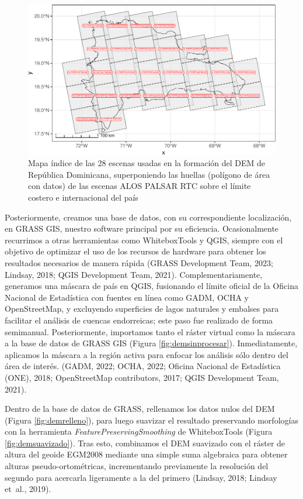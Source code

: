 \documentclass[spanish]{article}
\begin{document}
\begin{figure}

{\centering \includegraphics[width=0.8\linewidth]{preprint_files/figure-latex/mapaindice-1} 

}

\caption{Mapa índice de las 28 escenas usadas en la formación del DEM de República Dominicana, superponiendo las huellas (polígono de área con datos) de las escenas ALOS PALSAR RTC sobre el límite costero e internacional del país}\label{fig:mapaindice}
\end{figure}

Posteriormente, creamos una base de datos, con su correspondiente
localización, en GRASS GIS, nuestro software principal por su
eficiencia. Ocasionalmente recurrimos a otras herramientas como
WhiteboxTools y QGIS, siempre con el objetivo de optimizar el uso de los
recursos de hardware para obtener los resultados necesarios de manera
rápida (GRASS Development Team, 2023; Lindsay, 2018; QGIS Development
Team, 2021). Complementariamente, generamos una máscara de país en QGIS,
fusionando el límite oficial de la Oficina Nacional de Estadística con
fuentes en línea como GADM, OCHA y OpenStreetMap, y excluyendo
superficies de lagos naturales y embalses para facilitar el análisis de
cuencas endorreicas; este paso fue realizado de forma semimanual.
Posteriormente, importamos tanto el ráster virtual como la máscara a la
base de datos de GRASS GIS (Figura \ref{fig:demsinprocesar}).
Inmediatamente, aplicamos la máscara a la región activa para enfocar los
análisis sólo dentro del área de interés. (GADM, 2022; OCHA, 2022;
Oficina Nacional de Estadística (ONE), 2018; OpenStreetMap contributors,
2017; QGIS Development Team, 2021).

Dentro de la base de datos de GRASS, rellenamos los datos nulos del DEM
(Figura \ref{fig:demrelleno}), para luego suavizar el resultado
preservando morfologías con la herramienta
\emph{FeaturePreservingSmoothing} de WhiteboxTools (Figura
\ref{fig:demsuavizado}). Tras esto, combinamos el DEM suavizado con el
ráster de altura del geoide EGM2008 mediante una simple suma algebraica
para obtener alturas pseudo-ortométricas, incrementando previamente la
resolución del segundo para acercarla ligeramente a la del primero
(Lindsay, 2018; Lindsay et~al., 2019).
\end{document}

